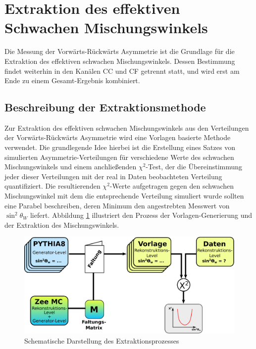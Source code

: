 \section{Extraktion des effektiven Schwachen Mischungswinkels}
\label{afb:sin2theta}

Die Messung der Vorwärts-Rückwärts Asymmetrie ist die Grundlage für die
Extraktion des effektiven schwachen Mischungswinkels. Dessen Bestimmung findet
weiterhin in den Kanälen \ac{CC} und \ac{CF} getrennt statt, und wird erst am
Ende zu einem Gesamt-Ergebnis kombiniert. 



\subsection{Beschreibung der Extraktionsmethode}
\label{afb:extraction_method}


Zur Extraktion des effektiven schwachen Mischungswinkels aus den Verteilungen
der Vorwärts-Rückwärts Asymmetrie wird eine Vorlagen basierte Methode
verwendet. Die grundlegende Idee hierbei ist die Erstellung eines Satzes von
simulierten Asymmetrie-Verteilungen für verschiedene Werte des schwachen
Mischungswinkels und einem anchließenden $\chi^2$-Test, der die Übereinstimmung
jeder dieser Verteilungen mit der real in Daten beobachteten Verteilung
quantifiziert. Die resultierenden $\chi^2$-Werte aufgetragen gegen den
schwachen Mischungswinkel mit dem die entsprechende Verteilung simuliert wurde
sollten eine Parabel beschreiben, deren Minimum den angestrebten Messwert von
$\sin^2\theta_W$ liefert. Abbildung \ref{fig:templates} illustriert den Prozess
der Vorlagen-Generierung und der Extraktion des Mischungswinkels.

\begin{figure}[h]
    \centering
    \includegraphics[width=1.0\textwidth]{img/templates}
    \caption[Schematische Darstellung des Extraktionsprozesses]
        {Schematische Darstellung des Extraktionsprozesses}
    \label{fig:templates}
\end{figure}

